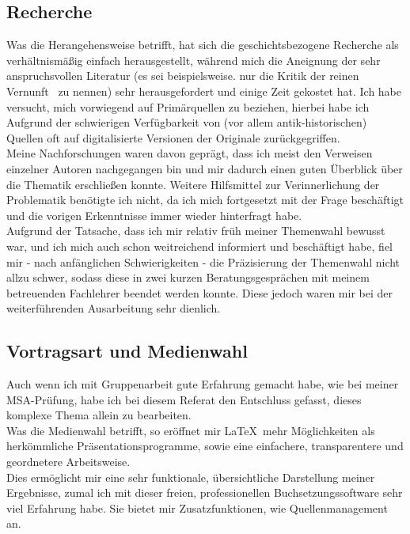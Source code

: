 \documentclass[12pt,a4paper,final]{article}
\begin{document}
\subsection*{Recherche}
Was die Herangehensweise betrifft, hat sich die geschichtsbezogene Recherche als verhältnismäßig einfach herausgestellt, während mich die Aneignung der sehr anspruchsvollen Literatur (es sei beispielsweise. nur die \glqq Kritik der reinen Vernunft\grqq\ \cite{ik_kritik}
 zu nennen) sehr herausgefordert und einige Zeit gekostet hat. Ich habe versucht, mich vorwiegend auf Primärquellen zu beziehen, hierbei habe ich Aufgrund der schwierigen Verfügbarkeit von (vor allem antik-historischen) Quellen oft auf digitalisierte Versionen der Originale zurückgegriffen.\\
Meine Nachforschungen waren davon geprägt, dass ich meist den Verweisen einzelner Autoren nachgegangen bin und mir dadurch einen guten Überblick über die Thematik erschließen konnte. Weitere Hilfsmittel zur Verinnerlichung der Problematik benötigte ich nicht, da ich mich fortgesetzt mit der Frage beschäftigt und die vorigen Erkenntnisse immer wieder hinterfragt habe.\\

Aufgrund der Tatsache, dass ich mir relativ früh meiner Themenwahl bewusst war, und ich mich auch schon weitreichend informiert und beschäftigt habe, fiel mir - nach anfänglichen Schwierigkeiten - die Präzisierung der Themenwahl nicht allzu schwer, sodass diese in zwei kurzen Beratungsgesprächen mit meinem betreuenden Fachlehrer beendet werden konnte. Diese jedoch waren mir bei der weiterführenden Ausarbeitung sehr dienlich.

\subsection*{Vortragsart und Medienwahl}
Auch wenn ich mit Gruppenarbeit gute Erfahrung gemacht habe, wie bei meiner MSA-Prüfung, 
habe ich bei diesem Referat den Entschluss gefasst, dieses komplexe Thema allein zu bearbeiten.\\
Was die Medienwahl betrifft, so eröffnet mir \LaTeX\ mehr Möglichkeiten als herkömmliche Präsentationsprogramme, sowie eine einfachere, transparentere und geordnetere Arbeitsweise.\\
Dies ermöglicht mir eine sehr funktionale, übersichtliche Darstellung meiner Ergebnisse, zumal ich mit dieser freien, professionellen Buchsetzungssoftware sehr viel Erfahrung habe. Sie bietet mir Zusatzfunktionen, wie Quellenmanagement an.
\end{document}
